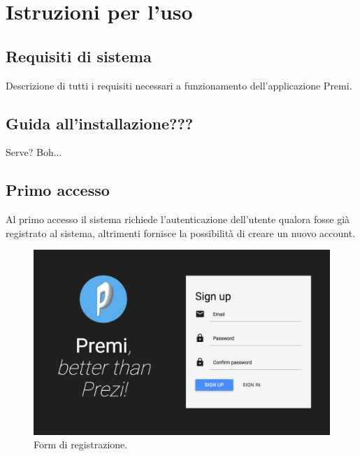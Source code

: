 \section{Istruzioni per l'uso}
\subsection{Requisiti di sistema}
Descrizione di tutti i requisiti necessari a funzionamento dell'applicazione Premi.

\subsection{Guida all'installazione???}
Serve? Boh...

\subsection{Primo accesso}
Al primo accesso il sistema richiede l'autenticazione dell'utente qualora fosse già registrato al sistema, altrimenti fornisce la possibilità di creare un nuovo account.
\begin{figure}[h]
\begin{center}
\includegraphics[scale=0.4]{img/signup.png}
\caption{Form di registrazione.}
\end{center}
\end{figure}

